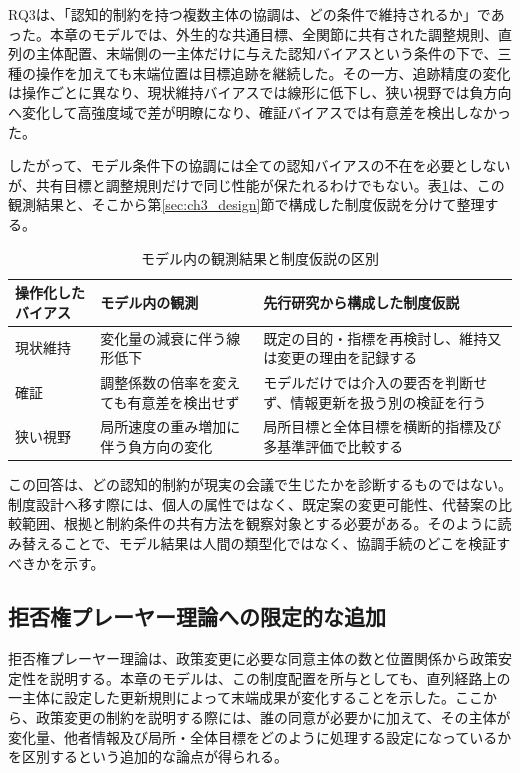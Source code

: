 RQ3は、「認知的制約を持つ複数主体の協調は、どの条件で維持されるか」であった。本章のモデルでは、外生的な共通目標、全関節に共有された調整規則、直列の主体配置、末端側の一主体だけに与えた認知バイアスという条件の下で、三種の操作を加えても末端位置は目標追跡を継続した。その一方、追跡精度の変化は操作ごとに異なり、現状維持バイアスでは線形に低下し、狭い視野では負方向へ変化して高強度域で差が明瞭になり、確証バイアスでは有意差を検出しなかった。

したがって、モデル条件下の協調には全ての認知バイアスの不在を必要としないが、共有目標と調整規則だけで同じ性能が保たれるわけでもない。表\ref{tab:ch3_classification}は、この観測結果と、そこから第\ref{sec:ch3_design}節で構成した制度仮説を分けて整理する。

\FloatBarrier
\begin{table}[htbp]
\centering
\caption{モデル内の観測結果と制度仮説の区別}
\label{tab:ch3_classification}
\begin{tabular}{|l|p{4.2cm}|p{5.3cm}|}
\hline
操作化したバイアス & モデル内の観測 & 先行研究から構成した制度仮説 \\
\hline
現状維持 & 変化量の減衰に伴う線形低下 & 既定の目的・指標を再検討し、維持又は変更の理由を記録する \\
確証 & 調整係数の倍率を変えても有意差を検出せず & モデルだけでは介入の要否を判断せず、情報更新を扱う別の検証を行う \\
狭い視野 & 局所速度の重み増加に伴う負方向の変化 & 局所目標と全体目標を横断的指標及び多基準評価で比較する \\
\hline
\end{tabular}
\end{table}
\FloatBarrier

この回答は、どの認知的制約が現実の会議で生じたかを診断するものではない。制度設計へ移す際には、個人の属性ではなく、既定案の変更可能性、代替案の比較範囲、根拠と制約条件の共有方法を観察対象とする必要がある。そのように読み替えることで、モデル結果は人間の類型化ではなく、協調手続のどこを検証すべきかを示す。

\subsection{拒否権プレーヤー理論への限定的な追加}

拒否権プレーヤー理論は、政策変更に必要な同意主体の数と位置関係から政策安定性を説明する。本章のモデルは、この制度配置を所与としても、直列経路上の一主体に設定した更新規則によって末端成果が変化することを示した。ここから、政策変更の制約を説明する際には、誰の同意が必要かに加えて、その主体が変化量、他者情報及び局所・全体目標をどのように処理する設定になっているかを区別するという追加的な論点が得られる。

